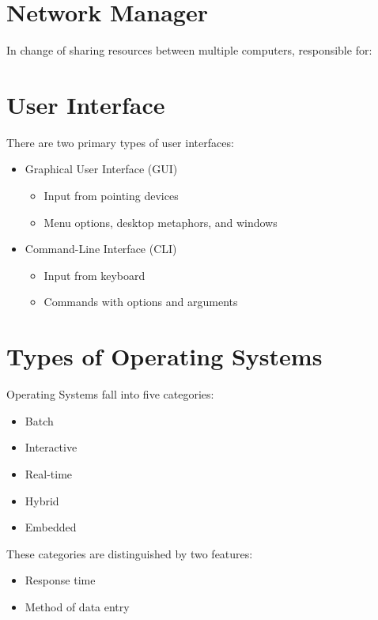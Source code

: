 \documentclass[12pt letter]{report}
\begin{document}
\section{Network Manager}

In change of sharing resources between multiple computers, responsible for:

\section{User Interface}


There are two primary types of user interfaces:

\begin{itemize}
  \item Graphical User Interface (GUI)
        \begin{itemize}
          \item Input from pointing devices
          \item Menu options, desktop metaphors, and windows
        \end{itemize}
  \item Command-Line Interface (CLI)
        \begin{itemize}
          \item Input from keyboard
          \item Commands with options and arguments
        \end{itemize}
\end{itemize}

\section{Types of Operating Systems}

Operating Systems fall into five categories:
\begin{itemize}
  \item Batch
  \item Interactive
  \item Real-time
  \item Hybrid
  \item Embedded
\end{itemize}
These categories are distinguished by two features:
\begin{itemize}
  \item Response time
  \item Method of data entry
\end{itemize}
\end{document}
